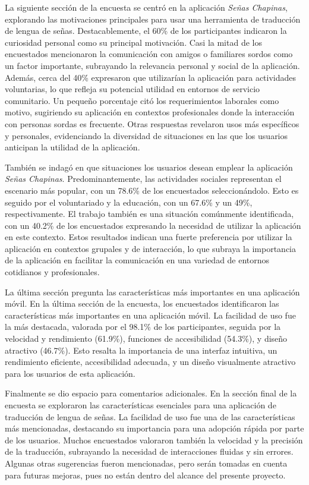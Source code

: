 La siguiente sección de la encuesta se centró en la aplicación \textit{Señas Chapinas}, explorando las motivaciones principales para usar una herramienta de traducción de lengua de señas. Destacablemente, el 60\% de los participantes indicaron la curiosidad personal como su principal motivación. Casi la mitad de los encuestados mencionaron la comunicación con amigos o familiares sordos como un factor importante, subrayando la relevancia personal y social de la aplicación. Además, cerca del 40\% expresaron que utilizarían la aplicación para actividades voluntarias, lo que refleja su potencial utilidad en entornos de servicio comunitario. Un pequeño porcentaje citó los requerimientos laborales como motivo, sugiriendo su aplicación en contextos profesionales donde la interacción con personas sordas es frecuente. Otras respuestas revelaron usos más específicos y personales, evidenciando la diversidad de situaciones en las que los usuarios anticipan la utilidad de la aplicación.

También se indagó en que situaciones los usuarios desean emplear la aplicación \textit{Señas Chapinas}. Predominantemente, las actividades sociales representan el escenario más popular, con un 78.6\% de los encuestados seleccionándolo. Esto es seguido por el voluntariado y la educación, con un 67.6\% y un 49\%, respectivamente. El trabajo también es una situación comúnmente identificada, con un 40.2\% de los encuestados expresando la necesidad de utilizar la aplicación en este contexto. Estos resultados indican una fuerte preferencia por utilizar la aplicación en contextos grupales y de interacción, lo que subraya la importancia de la aplicación en facilitar la comunicación en una variedad de entornos cotidianos y profesionales.

La última sección pregunta las características más importantes en una aplicación móvil. En la última sección de la encuesta, los encuestados identificaron las características más importantes en una aplicación móvil. La facilidad de uso fue la más destacada, valorada por el 98.1\% de los participantes, seguida por la velocidad y rendimiento (61.9\%), funciones de accesibilidad (54.3\%), y diseño atractivo (46.7\%). Esto resalta la importancia de una interfaz intuitiva, un rendimiento eficiente, accesibilidad adecuada, y un diseño visualmente atractivo para los usuarios de esta aplicación. 

Finalmente se dio espacio para comentarios adicionales. En la sección final de la encuesta se exploraron las características esenciales para una aplicación de traducción de lengua de señas. La facilidad de uso fue una de las características más mencionadas, destacando su importancia para una adopción rápida por parte de los usuarios. Muchos encuestados valoraron también la velocidad y la precisión de la traducción, subrayando la necesidad de interacciones fluidas y sin errores. Algunas otras sugerencias fueron mencionadas, pero serán tomadas en cuenta para futuras mejoras, pues no están dentro del alcance del presente proyecto. 


